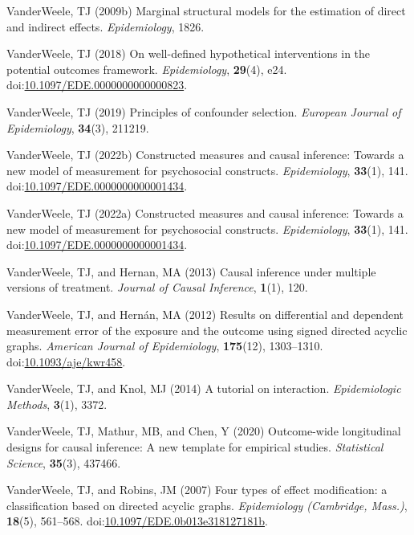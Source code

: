 \documentclass[
  singlecolumn,
  9pt]{article}
\begin{document}
\begin{CSLReferences}
VanderWeele, TJ (2009b) Marginal structural models for the estimation of
direct and indirect effects. \emph{Epidemiology}, 1826.

VanderWeele, TJ (2018) On well-defined hypothetical interventions in the
potential outcomes framework. \emph{Epidemiology}, \textbf{29}(4), e24.
doi:\href{https://doi.org/10.1097/EDE.0000000000000823}{10.1097/EDE.0000000000000823}.

VanderWeele, TJ (2019) Principles of confounder selection.
\emph{European Journal of Epidemiology}, \textbf{34}(3), 211219.

VanderWeele, TJ (2022b) Constructed measures and causal inference:
Towards a new model of measurement for psychosocial constructs.
\emph{Epidemiology}, \textbf{33}(1), 141.
doi:\href{https://doi.org/10.1097/EDE.0000000000001434}{10.1097/EDE.0000000000001434}.

VanderWeele, TJ (2022a) Constructed measures and causal inference:
Towards a new model of measurement for psychosocial constructs.
\emph{Epidemiology}, \textbf{33}(1), 141.
doi:\href{https://doi.org/10.1097/EDE.0000000000001434}{10.1097/EDE.0000000000001434}.

VanderWeele, TJ, and Hernan, MA (2013) Causal inference under multiple
versions of treatment. \emph{Journal of Causal Inference},
\textbf{1}(1), 120.

VanderWeele, TJ, and Hernán, MA (2012) Results on differential and
dependent measurement error of the exposure and the outcome using signed
directed acyclic graphs. \emph{American Journal of Epidemiology},
\textbf{175}(12), 1303--1310.
doi:\href{https://doi.org/10.1093/aje/kwr458}{10.1093/aje/kwr458}.

VanderWeele, TJ, and Knol, MJ (2014) A tutorial on interaction.
\emph{Epidemiologic Methods}, \textbf{3}(1), 3372.

VanderWeele, TJ, Mathur, MB, and Chen, Y (2020) Outcome-wide
longitudinal designs for causal inference: A new template for empirical
studies. \emph{Statistical Science}, \textbf{35}(3), 437466.

VanderWeele, TJ, and Robins, JM (2007) Four types of effect
modification: a classification based on directed acyclic graphs.
\emph{Epidemiology (Cambridge, Mass.)}, \textbf{18}(5), 561--568.
doi:\href{https://doi.org/10.1097/EDE.0b013e318127181b}{10.1097/EDE.0b013e318127181b}.


\end{CSLReferences}
\end{document}
